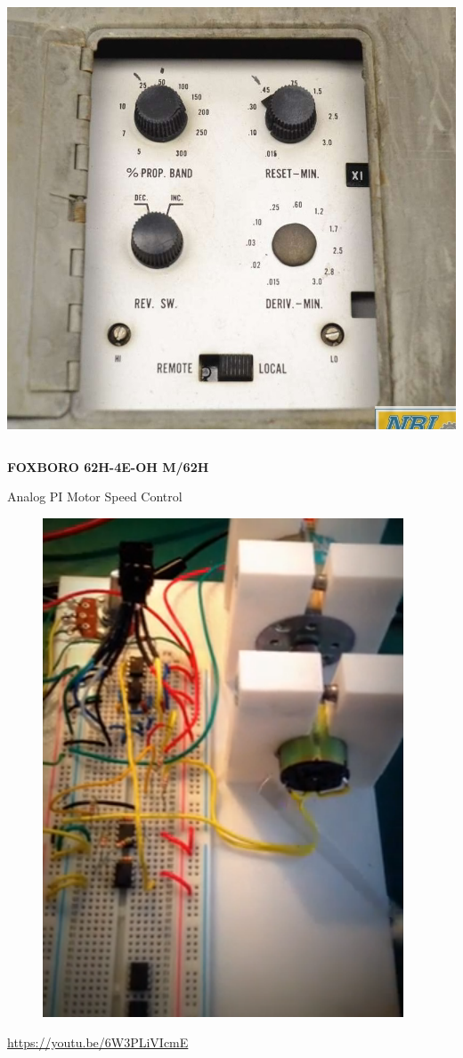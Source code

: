 \begin{frame}
\begin{columns}
\begin{column}{0.5\linewidth}
			\includegraphics[height=0.6\textheight]{img/fb4}
		\end{column}
	\end{columns}
	\begin{center}
		\textbf{FOXBORO 62H-4E-OH M/62H}
	\end{center}
\end{frame}
\begin{frame}{Analog PI Motor Speed Control}
	\begin{figure}
		\centering
		\includegraphics[width=0.4\linewidth]{img/feedback_motor}
	\end{figure}
	\url{https://youtu.be/6W3PLiVIcmE}
\end{frame}
